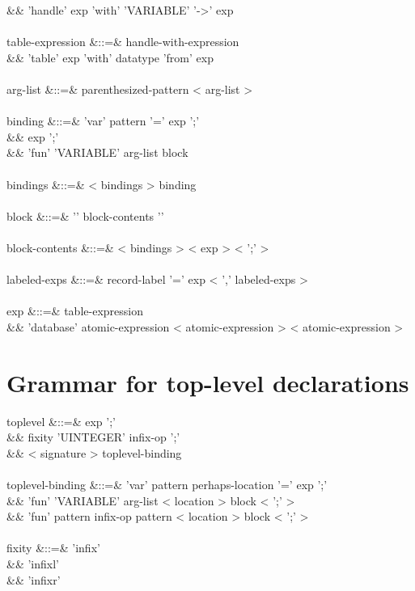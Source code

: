 \documentclass[11pt,a4paper]{article}
\begin{document}
\begin{grammar}
&&                          'handle' exp 'with' 'VARIABLE' '->' exp \\
\\
table-expression &::=&  handle-with-expression \\
&&                      'table' exp 'with' datatype 'from' exp \\
\\
arg-list &::=& parenthesized-pattern < arg-list >  \\
\\
binding &::=& 'var' pattern '=' exp ';' \\
&&            exp ';' \\
&&            'fun' 'VARIABLE' arg-list block \\
\\
bindings &::=& < bindings > binding \\
\\
block &::=& '{' block-contents '}' \\
\\
block-contents &::=& < bindings > < exp > < ';' >  \\
\\
labeled-exps &::=& record-label '=' exp < ',' labeled-exps > \\
\\
exp &::=& table-expression \\
&&        'database' atomic-expression < atomic-expression > < atomic-expression >  \\
\end{grammar} 

\section{Grammar for top-level declarations}

\begin{grammar}
toplevel &::=& exp ';' \\
&&             fixity 'UINTEGER' infix-op ';' \\
&&             < signature > toplevel-binding \\
\\
toplevel-binding &::=& 'var' pattern perhaps-location '=' exp ';' \\
&&                     'fun' 'VARIABLE' arg-list < location > block < ';' > \\
&&                     'fun' pattern infix-op pattern < location > block < ';' > \\
\\
fixity &::=& 'infix' \\
&&           'infixl' \\
&&           'infixr' \\
\end{grammar} 
 
\end{document}
